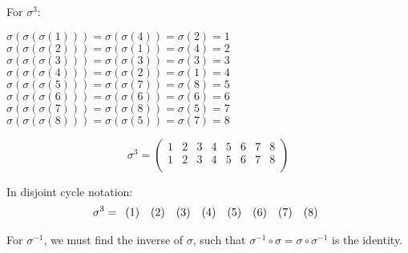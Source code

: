 \documentclass[a4paper]{article}
\begin{document}
\begin{myparindent}{0pt}
For $\sigma^3$:

$\sigma(\sigma(\sigma(1))) = \sigma(\sigma(4)) = \sigma(2) = 1$ \newline
$\sigma(\sigma(\sigma(2))) = \sigma(\sigma(1)) = \sigma(4) = 2$ \newline
$\sigma(\sigma(\sigma(3))) = \sigma(\sigma(3)) = \sigma(3) = 3$ \newline
$\sigma(\sigma(\sigma(4))) = \sigma(\sigma(2)) = \sigma(1) = 4$ \newline
$\sigma(\sigma(\sigma(5))) = \sigma(\sigma(7)) = \sigma(8) = 5$ \newline
$\sigma(\sigma(\sigma(6))) = \sigma(\sigma(6)) = \sigma(6) = 6$ \newline
$\sigma(\sigma(\sigma(7))) = \sigma(\sigma(8)) = \sigma(5) = 7$ \newline
$\sigma(\sigma(\sigma(8))) = \sigma(\sigma(5)) = \sigma(7) = 8$ \newline

\[
  \sigma^3 =
  \begin{pmatrix}
      1 & 2 & 3 & 4 & 5 & 6 & 7 & 8 \\
      1 & 2 & 3 & 4 & 5 & 6 & 7 & 8 \\
  \end{pmatrix}
\]

In disjoint cycle notation:
\[
    \noindent \sigma^3 =
    \noindent \begin{array}{r} (1) \end{array}
    \noindent \begin{array}{r} (2) \end{array}
    \noindent \begin{array}{r} (3) \end{array}
    \noindent \begin{array}{r} (4) \end{array}
    \noindent \begin{array}{r} (5) \end{array}
    \noindent \begin{array}{r} (6) \end{array}
    \noindent \begin{array}{r} (7) \end{array}
    \noindent \begin{array}{r} (8) \end{array}
\]

For $\sigma^{-1}$, we must find the inverse of $\sigma$, such that $\sigma^{-1} \circ \sigma = \sigma \circ \sigma^{-1}$ is the identity.


\end{myparindent}
\end{document}
